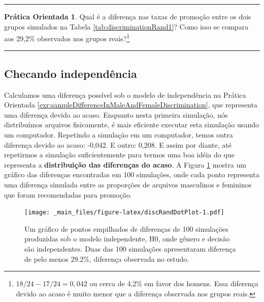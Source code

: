 \documentclass[
]{book}
\theoremstyle{definition}
\theoremstyle{definition}
\theoremstyle{definition}
\newtheorem{exercise}{Prática Orientada}[chapter]
\theoremstyle{definition}
\theoremstyle{remark}
\begin{document}
\begin{center}\rule{0.5\linewidth}{0.5pt}\end{center}

\begin{exercise}
\protect\hypertarget{exr:sampleDifferenceInMaleAndFemaleDiscrimination}{}{\label{exr:sampleDifferenceInMaleAndFemaleDiscrimination} }Qual é a diferença nas taxas de promoção entre os dois grupos simulados na Tabela \ref{tab:discriminationRand1}? Como isso se compara aos 29,2\% observados nos grupos reais?\footnote{\(18/24 - 17/24 = 0,042\) ou cerca de 4,2\% em favor dos homens. Essa diferença devido ao acaso é muito menor que a diferença observada nos grupos reais.}
\end{exercise}

\begin{center}\rule{0.5\linewidth}{0.5pt}\end{center}

\hypertarget{checkingIndependence}{%
\subsection{Checando independência}\label{checkingIndependence}}

Calculamos uma diferença possível sob o modelo de independência na Prática Orientada \ref{exr:sampleDifferenceInMaleAndFemaleDiscrimination}, que representa uma diferença devido ao acaso. Enquanto nesta primeira simulação, nós distribuímos arquivos fisicamente, é mais eficiente executar esta simulação usando um computador. Repetindo a simulação em um computador, temos outra diferença devido ao acaso: -0,042. E outro: 0,208. E assim por diante, até repetirmos a simulação suficientemente para termos uma boa idéia do que representa a \textbf{distribuição das diferenças do acaso}. A Figura \ref{fig:discRandDotPlot} mostra um gráfico das diferenças encontradas em 100 simulações, onde cada ponto representa uma diferença simulada entre as proporções de arquivos masculinos e femininos que foram recomendadas para promoção.

\begin{figure}
\centering
\texttt{[image: \_main\_files/figure-latex/discRandDotPlot-1.pdf]}
\caption{\label{fig:discRandDotPlot}Um gráfico de pontos empilhados de diferenças de 100 simulações produzidas sob o modelo independente, H0, onde gênero e decisão são independentes. Duas das 100 simulações apresentaram diferença de pelo menos 29.2\%, diferença observada no estudo.}
\end{figure}
\end{document}

